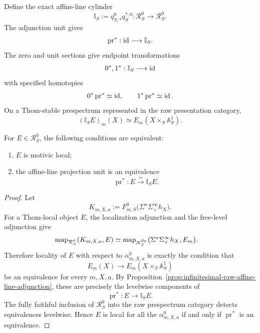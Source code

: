 \begin{definition}
\label{def:infinitesimal-affine-line-cylinder}
Define the exact affine-line cylinder
\[
  \boxed{
  \mathbb I_S
  :=
  q_{S,*}^0q_S^{*,0}:
  \mathcal R_S^0\longrightarrow\mathcal R_S^0.
  }
\]
The adjunction unit gives
\[
  \operatorname{pr}^*:\operatorname{id}\longrightarrow\mathbb I_S.
\]
The zero and unit sections give endpoint transformations
\[
  0^*,1^*:\mathbb I_S\longrightarrow\operatorname{id}
\]
with specified homotopies
\[
  0^*\operatorname{pr}^*\simeq\operatorname{id},
  \qquad
  1^*\operatorname{pr}^*\simeq\operatorname{id}.
\]
On a Thom-stable prespectrum represented in the raw presentation category,
\[
  (\mathbb I_SE)_m(X)
  \simeq
  E_m(X\times_S\mathbb A^1_S).
\]
\end{definition}

\begin{lemma}
\label{lem:infinitesimal-cylinder-locality}
For $E\in\mathcal R_S^0$, the following conditions are equivalent:
\begin{enumerate}
\item $E$ is motivic local;
\item the affine-line projection unit is an equivalence
\[
    \boxed{
    \operatorname{pr}^*:E\xrightarrow{\simeq}\mathbb I_SE.
    }
\]
\end{enumerate}
\end{lemma}

\begin{proof}
Let
\[
  K_{m,X,a}
  :=
  F^0_{m,S}\bigl(\Sigma^a\Sigma^\infty_+h_X\bigr).
\]
For a Thom-local object $E$, the localization adjunction and the free-level
adjunction give
\[
\begin{aligned}
  \operatorname{map}_{\mathcal R_S^0}(K_{m,X,a},E)
  &\simeq
  \operatorname{map}_{\mathcal N_S^{\mathrm{Sp}}}
  \bigl(\Sigma^a\Sigma^\infty_+h_X,E_m\bigr).
\end{aligned}
\]
Therefore locality of $E$ with respect to
$\alpha^0_{m,X,a}$ is exactly the condition that
\[
  E_m(X)
  \longrightarrow
  E_m(X\times_S\mathbb A^1_S)
\]
be an equivalence for every $m,X,a$.  By
Proposition~\ref{prop:infinitesimal-raw-affine-line-adjunction}, these are
precisely the levelwise components of
\[
  \operatorname{pr}^*:E\longrightarrow\mathbb I_SE.
\]
The fully faithful inclusion of $\mathcal R_S^0$ into the raw prespectrum
category detects equivalences levelwise.  Hence $E$ is local for all the
$\alpha^0_{m,X,a}$ if and only if $\operatorname{pr}^*$ is an equivalence.
\end{proof}

